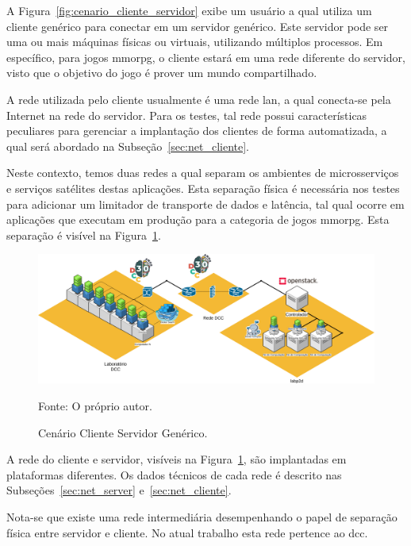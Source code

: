 A Figura~\ref{fig:cenario_cliente_servidor} exibe um usuário a qual utiliza um cliente genérico para conectar em um servidor genérico.
%
Este servidor pode ser uma ou mais máquinas físicas ou virtuais, utilizando múltiplos processos.
%
Em específico, para jogos \ac{mmorpg}, o cliente estará em uma rede diferente do servidor, visto que o objetivo do jogo é prover um mundo compartilhado.



A rede utilizada pelo cliente usualmente é uma rede \ac{lan}, a qual conecta-se pela Internet na rede do servidor.
%
Para os testes, tal rede possui características peculiares para gerenciar a implantação dos clientes de forma automatizada, a qual será abordado na Subseção~\ref{sec:net_cliente}.




Neste contexto, temos duas redes a qual separam os ambientes de microsserviços e serviços satélites destas aplicações.
%
Esta separação física é necessária nos testes para adicionar um limitador de transporte de dados e latência, tal qual ocorre em aplicações que executam em produção para a categoria de jogos \ac{mmorpg}.
%
Esta separação é visível na Figura~\ref{fig:net_completa}.

\begin{figure}[htb!]
  \caption{Cenário Cliente Servidor Genérico.}
  \label{fig:net_completa}
  \includegraphics[width=\textwidth]{figuras/ambiente/full.png}
  \centering

  Fonte: O próprio autor.
\end{figure}

A rede do cliente e servidor, visíveis na Figura~\ref{fig:net_completa}, são implantadas em plataformas diferentes.
%
Os dados técnicos de cada rede é descrito nas Subseções~\ref{sec:net_server} e~\ref{sec:net_cliente}.



Nota-se que existe uma rede intermediária desempenhando o papel de separação física entre servidor e cliente.
%
No atual trabalho esta rede pertence ao \ac{dcc}.

